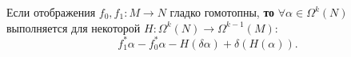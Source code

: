 \begin{to_thr}
	Если отображения $f_0, f_1 \colon M \rightarrow N$ гладко гомотопны, \textbf{то} $\forall \alpha \in \Omega^k (N)$ выполняется для некоторой $H \colon \Omega^k (N) \rightarrow \Omega^{k-1}(M)$:
	\begin{equation*}
		f_1^* \alpha - f_0^*\alpha - H(\delta \alpha) + \delta(H(\alpha)).
	\end{equation*}
\end{to_thr}